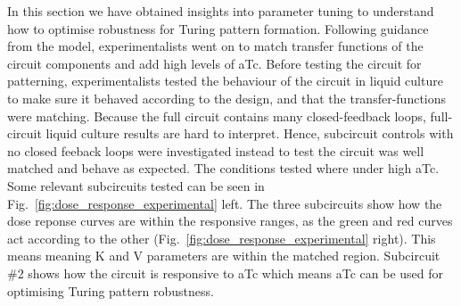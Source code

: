 In this section we have obtained insights into parameter tuning
to understand how to optimise robustness for Turing pattern formation.
Following guidance from the model,
experimentalists went on to match transfer functions of the circuit components and add high levels of aTc.
Before testing the circuit for patterning,
experimentalists tested the behaviour of the circuit in liquid culture to make sure it behaved according to the design,
and that the transfer-functions were matching.
Because the full circuit contains many closed-feedback loops, full-circuit liquid culture results are hard to interpret.
Hence,
subcircuit controls with no closed feeback loops were investigated
instead to test the circuit was well matched and behave as expected.
The conditions tested where under high aTc.
Some relevant subcircuits tested can be seen in Fig.~\ref{fig:dose_response_experimental} left.
The three subcircuits show how the dose reponse curves are within the responsive ranges, as the green and red curves act according to the other (Fig.~\ref{fig:dose_response_experimental} right).
This means meaning K and V parameters are within the matched region.
Subcircuit \#2 shows how the circuit is responsive to aTc which means aTc can be used for optimising Turing pattern robustness.

